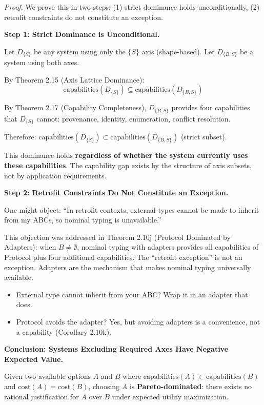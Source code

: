 \emph{Proof.} We prove this in two steps: (1) strict dominance holds
unconditionally, (2) retrofit constraints do not constitute an
exception.

\textbf{Step 1: Strict Dominance is Unconditional.}

Let \(D_{\{S\}}\) be any system using only the $\{S\}$ axis (shape-based). Let \(D_{\{B,S\}}\) be a system using both axes.

By Theorem 2.15 (Axis Lattice Dominance):
\[\text{capabilities}(D_{\{S\}}) \subseteq \text{capabilities}(D_{\{B,S\}})\]

By Theorem 2.17 (Capability Completeness), \(D_{\{B,S\}}\)
provides four capabilities that \(D_{\{S\}}\) cannot: provenance,
identity, enumeration, conflict resolution.

Therefore:
\(\text{capabilities}(D_{\{S\}}) \subset \text{capabilities}(D_{\{B,S\}})\)
(strict subset).

This dominance holds \textbf{regardless of whether the system currently
uses these capabilities}. The capability gap exists by the structure of
axis subsets, not by application requirements.

\textbf{Step 2: Retrofit Constraints Do Not Constitute an Exception.}

One might object: ``In retrofit contexts, external types cannot be made
to inherit from my ABCs, so nominal typing is unavailable.''

This objection was addressed in Theorem 2.10j (Protocol Dominated by
Adapters): when \(B \neq \emptyset\), nominal typing with adapters
provides all capabilities of Protocol plus four additional capabilities.
The ``retrofit exception'' is not an exception. Adapters are the
mechanism that makes nominal typing universally available.

\begin{itemize}
\tightlist
\item
  External type cannot inherit from your ABC? Wrap it in an adapter that
  does.
\item
  Protocol avoids the adapter? Yes, but avoiding adapters is a
  convenience, not a capability (Corollary 2.10k).
\end{itemize}

\textbf{Conclusion: Systems Excluding Required Axes Have Negative Expected Value.}

Given two available options \(A\) and \(B\) where
\(\text{capabilities}(A) \subset \text{capabilities}(B)\) and
\(\text{cost}(A) = \text{cost}(B)\), choosing \(A\) is
\textbf{Pareto-dominated}: there exists no rational justification for
\(A\) over \(B\) under expected utility maximization.


